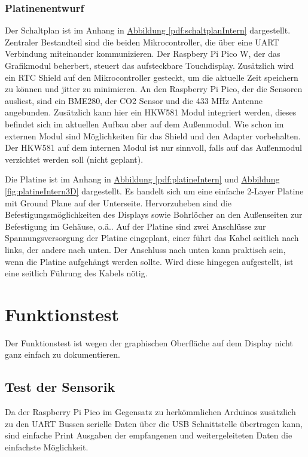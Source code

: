 \documentclass[a4paper,11pt]{article}
\newcounter{subsubsubsection}[subsubsection]
\begin{document}
\subsubsection{Platinenentwurf}
\label{subsubsub:platinenentwurfExtern} 

\label{subsubsubsub:schaltplanExtern}

Der Schaltplan ist im Anhang in \hyperref[pdf:schaltplanIntern]{Abbildung \ref{pdf:schaltplanIntern}} dargestellt. Zentraler Bestandteil sind die beiden Mikrocontroller, 
die über eine UART Verbindung miteinander kommunizieren. Der Raspbery Pi Pico W, der das Grafikmodul beherbert, steuert das aufsteckbare Touchdisplay. Zusätzlich wird
ein RTC Shield auf den Mikrocontroller gesteckt, um die aktuelle Zeit speichern zu können und jitter zu minimieren. 
An den Raspberry Pi Pico, der die Sensoren ausliest, sind ein BME280, der CO2 Sensor und die 433 MHz Antenne angebunden. Zusätzlich kann hier ein HKW581 Modul integriert werden, 
dieses befindet sich im aktuellen Aufbau aber auf dem Außenmodul. Wie schon im externen Modul sind Möglichkeiten für das Shield und den Adapter vorbehalten. 
Der HKW581 auf dem internen Modul ist nur sinnvoll, falls auf das Außenmodul verzichtet werden soll (nicht geplant).

\label{subsubsubsub:platineExtern}

Die Platine ist im Anhang in \hyperref[pdf:platineIntern]{Abbildung \ref{pdf:platineIntern}} und \hyperref[fig:platineIntern3D]{Abbildung \ref{fig:platineIntern3D}} dargestellt. Es handelt sich um eine einfache 2-Layer Platine mit Ground Plane
auf der Unterseite. Hervorzuheben sind die Befestigungsmöglichkeiten des Displays sowie Bohrlöcher an den Außenseiten zur Befestigung im Gehäuse, o.ä..
Auf der Platine sind zwei Anschlüsse zur Spannungsversorgung der Platine eingeplant, einer führt das Kabel seitlich nach links, der andere nach unten. 
Der Anschluss nach unten kann praktisch sein, wenn die Platine aufgehängt werden sollte. Wird diese hingegen aufgestellt, ist eine seitlich Führung des Kabels nötig. 


\section{Funktionstest}
\label{sub:funktionstest}

Der Funktionstest ist wegen der graphischen Oberfläche auf dem Display nicht ganz einfach zu dokumentieren. 

\subsection{Test der Sensorik}
Da der Raspberry Pi Pico im Gegensatz zu herkömmlichen Arduinos zusätzlich zu den UART Bussen serielle Daten über die USB Schnittstelle übertragen kann, 
sind einfache Print Ausgaben der empfangenen und weitergeleiteten Daten die einfachste Möglichkeit. 
\end{document}
